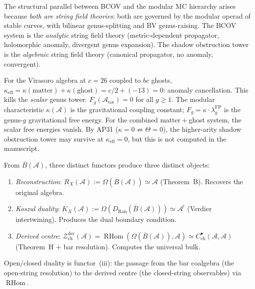 \documentclass[11pt]{article}
\newcommand{\cA}{\mathcal{A}}
\newcommand{\cZ}{\mathcal{Z}}
\newcommand{\barB}{\overline{B}}
\newcommand{\RHom}{\operatorname{RHom}}
\begin{document}
The structural parallel between BCOV and the modular MC
hierarchy arises because \emph{both are string field theories}:
both are governed by the modular operad of stable curves, with
bilinear genus-splitting and BV genus-raising.  The BCOV system
is the \emph{analytic} string field theory (metric-dependent
propagator, holomorphic anomaly, divergent genus expansion).
The shadow obstruction tower is the \emph{algebraic} string field theory
(canonical propagator, no anomaly, convergent).

For the Virasoro algebra at $c = 26$ coupled to $bc$ ghosts,
$\kappa_{\mathrm{eff}} = \kappa(\mathrm{matter})
+ \kappa(\mathrm{ghost}) = c/2 + (-13) = 0$: anomaly
cancellation.  This kills the \emph{scalar} genus tower:
$F_g(\cA_{\mathrm{tot}}) = 0$ for all $g \geq 1$.  The
modular characteristic $\kappa(\cA)$ is the gravitational
coupling constant; $F_g = \kappa \cdot
\lambda_g^{\mathrm{FP}}$ is the genus-$g$ gravitational free
energy.  For the combined matter${}+{}$ghost system, the
scalar free energies vanish.  By AP31 ($\kappa = 0 \not\Rightarrow
\Theta = 0$), the higher-arity shadow obstruction tower may survive at
$\kappa_{\mathrm{eff}} = 0$, but this is not computed in the
manuscript.

\begin{observation}
\label{obs:three-functors}
From $\barB(\cA)$, three distinct functors produce three
distinct objects:
\begin{enumerate}[label=\textup{(\roman*)},nosep]
\item \emph{Reconstruction}:
  $R_X(\cA) := \Omega(\barB(\cA)) \simeq \cA$ (Theorem~B).
  Recovers the original algebra.
\item \emph{Koszul duality}:
  $K_X(\cA) := \Omega(D_{\mathrm{Ran}}(\barB(\cA)))
  \simeq \cA^!$ (Verdier intertwining).
  Produces the dual boundary condition.
\item \emph{Derived centre}:
  $\cZ^{\mathrm{der}}_{\mathrm{ch}}(\cA)
  = \RHom(\Omega(\barB(\cA)), \cA)
  \simeq C^\bullet_{\mathrm{ch}}(\cA, \cA)$
  (Theorem~H + bar resolution).
  Computes the universal bulk.
\end{enumerate}
Open/closed duality is functor~(iii): the passage from the
bar coalgebra (the open-string resolution) to the derived centre
(the closed-string observables) via $\RHom$.
\end{observation}
\end{document}
